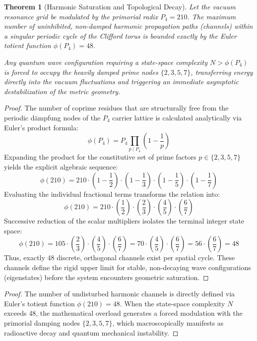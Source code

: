 \documentclass[11pt,a4paper]{article}
\theoremstyle{plain}
\newtheorem{theorem}{Theorem}[section] %
\theoremstyle{definition}
\theoremstyle{remark}
\begin{document}

\begin{theorem}[Harmonic Saturation and Topological Decay]
Let the vacuum resonance grid be modulated by the primorial radix $P_4 = 210$. The maximum number of uninhibited, non-damped harmonic propagation paths (channels) within a singular periodic cycle of the Clifford torus is bounded exactly by the Euler totient function $\phi(P_4) = 48$. 

Any quantum wave configuration requiring a state-space complexity $N > \phi(P_4)$ is forced to occupy the heavily damped prime nodes $\{2, 3, 5, 7\}$, transferring energy directly into the vacuum fluctuations and triggering an immediate asymptotic destabilization of the metric geometry.
\end{theorem}

\begin{proof}
The number of coprime residues that are structurally free from the periodic dämpfung nodes of the $P_4$ carrier lattice is calculated analytically via Euler's product formula:
\begin{equation}
\phi(P_4) = P_4 \prod_{p \mid P_4} \left(1 - \frac{1}{p}\right)
\end{equation}
Expanding the product for the constitutive set of prime factors $p \in \{2, 3, 5, 7\}$ yields the explicit algebraic sequence:
\begin{equation}
\phi(210) = 210 \cdot \left(1 - \frac{1}{2}\right) \cdot \left(1 - \frac{1}{3}\right) \cdot \left(1 - \frac{1}{5}\right) \cdot \left(1 - \frac{1}{7}\right)
\end{equation}
Evaluating the individual fractional terms transforms the relation into:
\begin{equation}
\phi(210) = 210 \cdot \left(\frac{1}{2}\right) \cdot \left(\frac{2}{3}\right) \cdot \left(\frac{4}{5}\right) \cdot \left(\frac{6}{7}\right)
\end{equation}
Successive reduction of the scalar multipliers isolates the terminal integer state space:
\begin{equation}
\phi(210) = 105 \cdot \left(\frac{2}{3}\right) \cdot \left(\frac{4}{5}\right) \cdot \left(\frac{6}{7}\right) = 70 \cdot \left(\frac{4}{5}\right) \cdot \left(\frac{6}{7}\right) = 56 \cdot \left(\frac{6}{7}\right) = 48
\end{equation}
Thus, exactly 48 discrete, orthogonal channels exist per spatial cycle. These channels define the rigid upper limit for stable, non-decaying wave configurations (eigenstates) before the system encounters geometric saturation.
\end{proof}
\begin{proof}
The number of undisturbed harmonic channels is directly defined via Euler's totient function $\phi(210) = 48$. When the state-space complexity $N$ exceeds 48, the mathematical overload generates a forced modulation with the primorial damping nodes $\{2, 3, 5, 7\}$, which macroscopically manifests as radioactive decay and quantum mechanical instability.
\end{proof}
\end{document}
